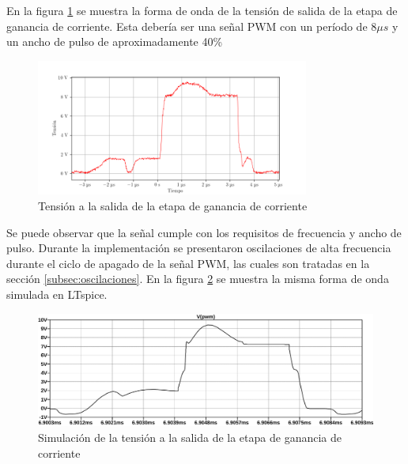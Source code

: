 En la figura \ref{fig:osc_pwm_vout_disconnected} se muestra la forma de onda de la tensión de salida de la etapa de ganancia de corriente.
Esta debería ser una señal PWM con un período de $8\mu s$ y un ancho de pulso de aproximadamente 40\%

\begin{figure}[H]
    \centering
    \includegraphics[width=0.8\textwidth]{images/capturas-osciloscopio/17-11-2022/1.png}
    \caption{Tensión a la salida de la etapa de ganancia de corriente}
    \label{fig:osc_pwm_vout_disconnected}
\end{figure}


Se puede observar que la señal cumple con los requisitos de frecuencia y ancho de pulso.
Durante la implementación se presentaron oscilaciones de alta frecuencia durante el ciclo de apagado de la señal PWM, las cuales son tratadas en la sección \ref{subsec:oscilaciones}.
En la figura \ref{fig:sim:osc_pwm_vout} se muestra la misma forma de onda simulada en LTspice.

\begin{figure}[H]
    \centering
    \includegraphics[width=\textwidth]{images/sim/3.pdf}
    \caption{Simulación de la tensión a la salida de la etapa de ganancia de corriente}
    \label{fig:sim:osc_pwm_vout}
\end{figure}

